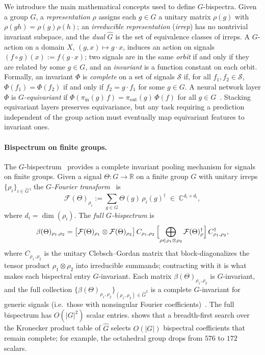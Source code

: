 \documentclass{article}
\theoremstyle{definition}
\theoremstyle{remark}
\newcommand{\R}{\mathbb{R}}
\newcommand{\C}{\mathbb{C}}
\theoremstyle{definition}
\begin{document}
We introduce the main mathematical concepts used to define $G$-bispectra.
Given a group $G$, a \emph{representation} $\rho$ assigns each $g\in G$ a
unitary matrix $\rho(g)$ with $\rho(gh)=\rho(g)\rho(h)$; an
\emph{irreducible representation} (\emph{irrep}) has no nontrivial
invariant subspace, and the \emph{dual} $\hat{G}$ is the set of equivalence
classes of irreps. A $G$-action on a domain $X$,
$(g,x)\mapsto g\cdot x$, induces an action on signals
$(f\circ g)(x):= f(g\cdot x)$; two signals are in the same \emph{orbit}
if and only if they are related by some $g\in G$, and an \emph{invariant}
is a function constant on each orbit. Formally, an invariant $\Phi$ is
\emph{complete} on a set of signals $\mathcal{S}$ if, for all
$f_1, f_2 \in \mathcal{S}$, $\Phi(f_1)=\Phi(f_2)$ if and only if
$f_2 = g \cdot f_1$ for some $g \in G$.
A neural network layer $\Phi$ is \emph{$G$-equivariant} if
$\Phi(\pi_{\mathrm{in}}(g)\, f) = \pi_{\mathrm{out}}(g)\, \Phi(f)$
for all $g \in G$~\citep{cohen2016group, weiler2019general}.
Stacking equivariant layers preserves equivariance, but any task requiring
a prediction independent of the group action must eventually map equivariant
features to invariant ones.

\paragraph{Bispectrum on finite groups.}
The $G$-bispectrum~\citep{kakarala1992triple, mataigne2024selective}
provides a complete invariant pooling mechanism for signals on finite
groups. Given a signal $\Theta : G \to \R$ on a finite group $G$ with
unitary irreps $\{\rho_i\}_{i\in\hat{G}}$, the \emph{$G$-Fourier
transform}~\citep{diaconis1990fourier} is
\begin{equation}\label{eq:fourier-finite}
  \mathcal{F}(\Theta)_{\rho_i}
  := \sum_{g \in G} \Theta(g)\, \rho_i(g)^{\dagger}
  \;\in\; \C^{d_i \times d_i},
\end{equation}
where $d_i = \dim(\rho_i)$. The \emph{full $G$-bispectrum} is
\begin{equation}\label{eq:bispectrum-def}
  \beta(\Theta)_{\rho_1,\rho_2}
  = \bigl[\mathcal{F}(\Theta)_{\rho_1} \otimes
    \mathcal{F}(\Theta)_{\rho_2}\bigr]\,
    C_{\rho_1,\rho_2}\,
    \Bigl[\bigoplus_{\rho \in \rho_1 \otimes \rho_2}
      \mathcal{F}(\Theta)_{\rho}^{\dagger}\Bigr]\,
    C_{\rho_1,\rho_2}^{\dagger},
\end{equation}
where $C_{\rho_1,\rho_2}$ is the unitary Clebsch--Gordan matrix that
block-diagonalizes the tensor product $\rho_1 \otimes \rho_2$ into
irreducible summands; contracting with it is what makes each bispectral
entry $G$-invariant. Each matrix
$\beta(\Theta)_{\rho_1,\rho_2}$ is $G$-invariant, and the full collection
$\{\beta(\Theta)_{\rho_1,\rho_2}\}_{(\rho_1,\rho_2)\in\hat{G}^2}$
is a complete $G$-invariant for generic signals (i.e.\ those with
nonsingular Fourier coefficients)~\citep{kakarala1992triple}.
The full bispectrum has $O(|G|^2)$ scalar entries.
\citet{mataigne2024selective} shows that a breadth-first search over
the Kronecker product table of $\hat{G}$ selects $O(|G|)$ bispectral
coefficients that remain complete; for example, the octahedral group
drops from $576$ to $172$ scalars.
\end{document}
